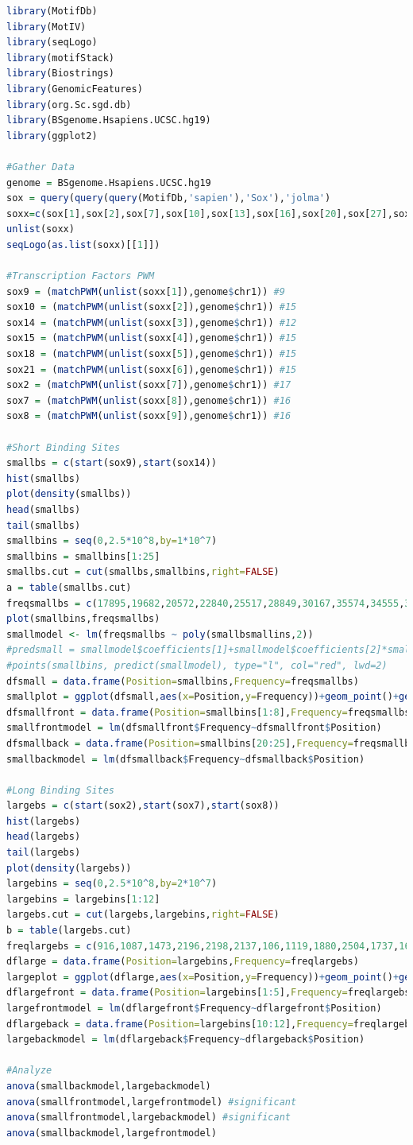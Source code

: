 \documentclass[12pt, a4paper]{article}
\begin{document}
\begin{lstlisting}[language=R]
library(MotifDb)
library(MotIV)
library(seqLogo)
library(motifStack)
library(Biostrings)
library(GenomicFeatures)
library(org.Sc.sgd.db)
library(BSgenome.Hsapiens.UCSC.hg19)
library(ggplot2)

#Gather Data
genome = BSgenome.Hsapiens.UCSC.hg19
sox = query(query(query(MotifDb,'sapien'),'Sox'),'jolma')
soxx=c(sox[1],sox[2],sox[7],sox[10],sox[13],sox[16],sox[20],sox[27],sox[30])
unlist(soxx)
seqLogo(as.list(soxx)[[1]])

#Transcription Factors PWM
sox9 = (matchPWM(unlist(soxx[1]),genome$chr1)) #9
sox10 = (matchPWM(unlist(soxx[2]),genome$chr1)) #15
sox14 = (matchPWM(unlist(soxx[3]),genome$chr1)) #12
sox15 = (matchPWM(unlist(soxx[4]),genome$chr1)) #15
sox18 = (matchPWM(unlist(soxx[5]),genome$chr1)) #15
sox21 = (matchPWM(unlist(soxx[6]),genome$chr1)) #15
sox2 = (matchPWM(unlist(soxx[7]),genome$chr1)) #17
sox7 = (matchPWM(unlist(soxx[8]),genome$chr1)) #16
sox8 = (matchPWM(unlist(soxx[9]),genome$chr1)) #16

#Short Binding Sites
smallbs = c(start(sox9),start(sox14))
hist(smallbs)
plot(density(smallbs))
head(smallbs)
tail(smallbs)
smallbins = seq(0,2.5*10^8,by=1*10^7)
smallbins = smallbins[1:25]
smallbs.cut = cut(smallbs,smallbins,right=FALSE)
a = table(smallbs.cut)
freqsmallbs = c(17895,19682,20572,22840,25517,28849,30167,35574,34555,32751,35236,29104,3732,0,17685,25993,28926,30252,31651,37543,23364,31494,27571,29111,27572)
plot(smallbins,freqsmallbs)
smallmodel <- lm(freqsmallbs ~ poly(smallbsmallins,2))
#predsmall = smallmodel$coefficients[1]+smallmodel$coefficients[2]*smallbins+smallmodel$coefficients[3]*smallbins^2
#points(smallbins, predict(smallmodel), type="l", col="red", lwd=2)
dfsmall = data.frame(Position=smallbins,Frequency=freqsmallbs)
smallplot = ggplot(dfsmall,aes(x=Position,y=Frequency))+geom_point()+geom_smooth()+labs(title="Short Binding Sites")
dfsmallfront = data.frame(Position=smallbins[1:8],Frequency=freqsmallbs[1:8])
smallfrontmodel = lm(dfsmallfront$Frequency~dfsmallfront$Position)
dfsmallback = data.frame(Position=smallbins[20:25],Frequency=freqsmallbs[20:25])
smallbackmodel = lm(dfsmallback$Frequency~dfsmallback$Position)

#Long Binding Sites
largebs = c(start(sox2),start(sox7),start(sox8))
hist(largebs)
head(largebs)
tail(largebs)
plot(density(largebs))
largebins = seq(0,2.5*10^8,by=2*10^7)
largebins = largebins[1:12]
largebs.cut = cut(largebs,largebins,right=FALSE)
b = table(largebs.cut)                                                                                       
freqlargebs = c(916,1087,1473,2196,2198,2137,106,1119,1880,2504,1737,1676)
dflarge = data.frame(Position=largebins,Frequency=freqlargebs)
largeplot = ggplot(dflarge,aes(x=Position,y=Frequency))+geom_point()+geom_smooth()+labs(title="Large Binding Sites")
dflargefront = data.frame(Position=largebins[1:5],Frequency=freqlargebs[1:5])
largefrontmodel = lm(dflargefront$Frequency~dflargefront$Position)
dflargeback = data.frame(Position=largebins[10:12],Frequency=freqlargebs[10:12])
largebackmodel = lm(dflargeback$Frequency~dflargeback$Position)

#Analyze
anova(smallbackmodel,largebackmodel)
anova(smallfrontmodel,largefrontmodel) #significant
anova(smallfrontmodel,largebackmodel) #significant
anova(smallbackmodel,largefrontmodel)
\end{lstlisting}


\end{document}
